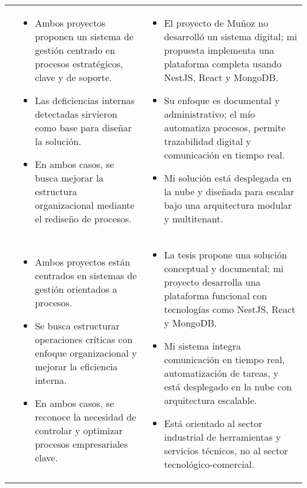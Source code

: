 \begin{longtable}{m{.05\paperwidth} *{2}{m{.33\paperwidth}} @{}}
\cite{Munoz2018} &
\begin{itemize}
  \item Ambos proyectos proponen un sistema de gestión centrado en procesos estratégicos, clave y de soporte.
  \item Las deficiencias internas detectadas sirvieron como base para diseñar la solución.
  \item En ambos casos, se busca mejorar la estructura organizacional mediante el rediseño de procesos.
\end{itemize} &
\begin{itemize}
  \item El proyecto de Muñoz no desarrolló un sistema digital; mi propuesta implementa una plataforma completa usando NestJS, React y MongoDB.
  \item Su enfoque es documental y administrativo; el mío automatiza procesos, permite trazabilidad digital y comunicación en tiempo real.
  \item Mi solución está desplegada en la nube y diseñada para escalar bajo una arquitectura modular y multitenant.
\end{itemize} \\


\cite{Jacome2016} &
\begin{itemize}
  \item Ambos proyectos están centrados en sistemas de gestión orientados a procesos.
  \item Se busca estructurar operaciones críticas con enfoque organizacional y mejorar la eficiencia interna.
  \item En ambos casos, se reconoce la necesidad de controlar y optimizar procesos empresariales clave.
\end{itemize} &
\begin{itemize}
  \item La tesis propone una solución conceptual y documental; mi proyecto desarrolla una plataforma funcional con tecnologías como NestJS, React y MongoDB.
  \item Mi sistema integra comunicación en tiempo real, automatización de tareas, y está desplegado en la nube con arquitectura escalable.
  \item Está orientado al sector industrial de herramientas y servicios técnicos, no al sector tecnológico-comercial.
\end{itemize} \\



\end{longtable}
